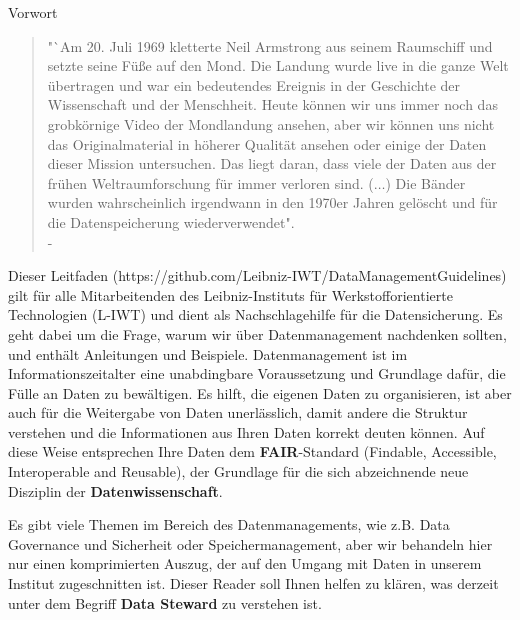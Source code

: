 \thispagestyle{empty}
\begin{center}
  \large\headerfont{}\textcolor{iwtdark}{Vorwort}
\end{center}

\begin{quote}
  "`Am 20. Juli 1969 kletterte Neil Armstrong aus seinem Raumschiff und setzte
  seine Füße auf den Mond. Die Landung wurde live in die ganze Welt übertragen
  und war ein bedeutendes Ereignis in der Geschichte der Wissenschaft und der
  Menschheit. Heute können wir uns immer noch das grobkörnige Video der
  Mondlandung ansehen, aber wir können uns nicht das Originalmaterial in höherer
  Qualität ansehen oder einige der Daten dieser Mission untersuchen. Das
  liegt daran, dass viele der Daten aus der frühen Weltraumforschung für immer
  verloren sind. ($\ldots$) Die Bänder wurden wahrscheinlich irgendwann in den 1970er
  Jahren gelöscht und für die Datenspeicherung wiederverwendet". \\
  \null\hfill - \citeauthor{briney2015}\cite{briney2015}
\end{quote}

\noindent Dieser Leitfaden (https://github.com/Leibniz-IWT/DataManagementGuidelines) gilt für alle Mitarbeitenden des Leibniz-Instituts für Werkstofforientierte Technologien (L-IWT) und
dient als Nachschlagehilfe für die Datensicherung. Es geht dabei um die Frage,
warum wir über Datenmanagement nachdenken sollten, und enthält Anleitungen und
Beispiele. Datenmanagement ist im Informationszeitalter eine unabdingbare
Voraussetzung und Grundlage dafür, die Fülle an Daten zu bewältigen. Es hilft,
die eigenen Daten zu organisieren, ist aber auch für die Weitergabe von Daten
unerlässlich, damit andere die Struktur verstehen und die Informationen aus
Ihren Daten korrekt deuten können. Auf diese Weise entsprechen Ihre Daten dem
\textbf{FAIR}-Standard (Findable, Accessible, Interoperable and Reusable), der
Grundlage für die sich abzeichnende neue Disziplin der
\textbf{Datenwissenschaft}.

Es gibt viele Themen im Bereich des Datenmanagements, wie z.B. Data Governance
und Sicherheit oder Speichermanagement, aber wir behandeln hier nur einen
komprimierten Auszug, der auf den Umgang mit Daten in unserem Institut
zugeschnitten ist. Dieser Reader soll Ihnen helfen zu klären, was derzeit unter dem Begriff \textbf{Data Steward} zu verstehen ist.
